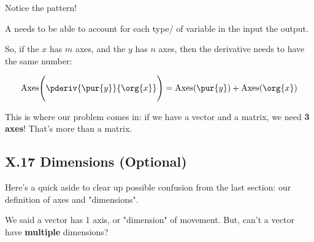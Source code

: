         Notice the pattern!\\
        
        \begin{concept}
            A  needs to be able to account for each type/ of variable in the input  the output.
            
            So, if the  $x$ has $m$ axes, and the  $y$ has $n$ axes, then the derivative needs to have the same  number:
            
            \begin{equation}
                \text{Axes}
                \Bigg(
                    \pderiv{\pur{y}}{\org{x}}
                \Bigg) 
                = 
                \text{Axes}(\pur{y}) + \text{Axes}(\org{x})
            \end{equation}
        \end{concept}
        
        This is where our problem comes in: if we have a vector and a matrix, we need \textbf{3 axes}! That's more than a matrix.
    
    \secdiv
    
    \subsection*{X.17 \quad Dimensions (Optional)}
        \label{X.17}
    
        Here's a quick aside to clear up possible confusion from the last section: our definition of axes and "dimensions".
        
        We said a vector has 1 axis, or "dimension" of movement. But, can't a vector have \textbf{multiple} dimensions?\\
        
